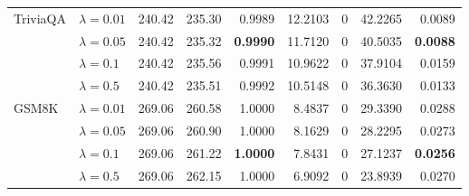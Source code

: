 \begin{table}[t]
{\begin{tabular}{l l rrrrrrr}
\midrule
TriviaQA & $\lambda{=}0.01$ & 240.42 & 235.30 & 0.9989 & 12.2103 & \cellcolor{cyan!12} $0$ & 42.2265 & 0.0089 \\
 & $\lambda{=}0.05$ & 240.42 & 235.32 & \textbf{0.9990} & 11.7120 & \cellcolor{cyan!12} $0$ & 40.5035 & \textbf{0.0088} \\
 & $\lambda{=}0.1$ & 240.42 & 235.56 & 0.9991 & 10.9622 & \cellcolor{cyan!12} $0$ & 37.9104 & 0.0159 \\
 & $\lambda{=}0.5$ & 240.42 & 235.51 & 0.9992 & 10.5148 & \cellcolor{cyan!12} $0$ & 36.3630 & 0.0133 \\
\midrule
GSM8K & $\lambda{=}0.01$ & 269.06 & 260.58 & 1.0000 & 8.4837 & \cellcolor{cyan!12} $0$ & 29.3390 & 0.0288 \\
 & $\lambda{=}0.05$ & 269.06 & 260.90 & 1.0000 & 8.1629 & \cellcolor{cyan!12} $0$ & 28.2295 & 0.0273 \\
 & $\lambda{=}0.1$ & 269.06 & 261.22 & \textbf{1.0000} & 7.8431 & \cellcolor{cyan!12} $0$ & 27.1237 & \textbf{0.0256} \\
 & $\lambda{=}0.5$ & 269.06 & 262.15 & 1.0000 & 6.9092 & \cellcolor{cyan!12} $0$ & 23.8939 & 0.0270 \\
\bottomrule
\end{tabular}}
\end{table}